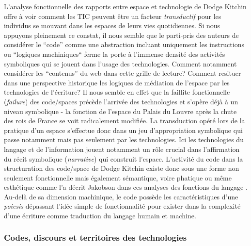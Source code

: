 L’analyse fonctionnelle des rapports entre espace et technologie de Dodge  Kitchin offre à voir comment les TIC peuvent être un facteur \textit{transductif} pour les individus se mouvant dans les espaces de leurs vies quotidiennes. Si nous appuyons pleinement ce constat, il nous semble que le parti-pris des auteurs de considérer le “code” comme une abstraction incluant uniquement les instructions ou “logiques machiniques“ ferme la porte à l’immense densité des activités symboliques qui se jouent dans l’usage des technologies. Comment notamment considérer les “contenus” du web dans cette grille de lecture? Comment resituer dans une perspective historique les logiques de médiation de l’espace par les technologies de l’écriture? Il nous semble en effet que la faillite fonctionnelle (\textit{failure}) des code/spaces précède l’arrivée des technologies et s’opère déjà à un niveau symbolique - la fonction de l’espace du Palais du Louvre après la chute des rois de France se voit radicalement modifiée. La transduction opéré lors de la pratique d’un espace s’effectue donc dans un jeu d’appropriation symbolique qui passe notamment mais pas seulement par les technologies. Ici les technologies du langage et de l’information jouent notamment un rôle crucial dans l’affirmation du récit symbolique (\textit{narrative}) qui construit l’espace. L’activité du code dans la structuration des code/space de Dodge  Kitchin existe donc sous une forme non seulement fonctionnelle mais également sémantique, voire phatique ou même esthétique comme l’a décrit Jakobson dans ces analyses des fonctions du langage \citep{Jakobson1956}. Au-delà de sa dimension machinique, le code possède les caractéristiques d’une \textit{poiesis} dépassant l’idée simple de fonctionnalité pour exister dans la complexité d’une écriture comme traduction du langage humain et machine.

\subsubsection[Codes, discours et territoires des technologies]{Codes, discours et territoires des technologies}

